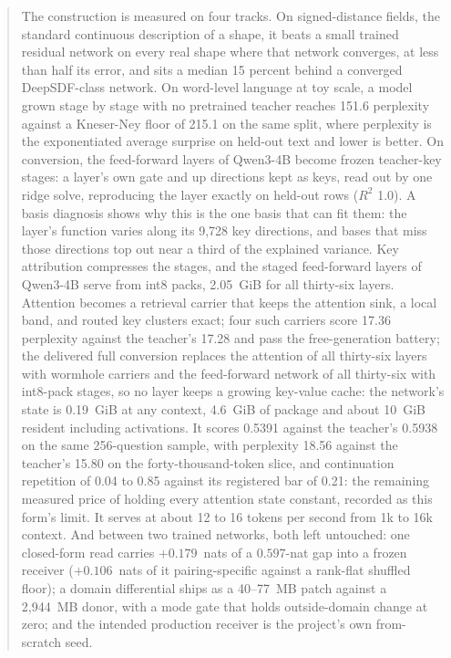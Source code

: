 \documentclass[11pt]{article}
\begin{document}
\begin{abstract}
The construction is measured on four tracks. On signed-distance
fields, the standard continuous description of a shape, it beats a
small trained residual network on every real shape where that
network converges, at less than half its error, and sits a median
15 percent behind a converged DeepSDF-class network. On word-level
language at toy scale, a model grown stage by stage with no
pretrained teacher reaches 151.6 perplexity against a Kneser-Ney
floor of 215.1 on the same split, where perplexity is the
exponentiated average surprise on held-out text and lower is
better. On conversion, the feed-forward layers of Qwen3-4B become
frozen teacher-key stages: a layer's own gate and up directions
kept as keys, read out by one ridge solve, reproducing the layer
exactly on held-out rows ($R^2$ 1.0). A basis diagnosis shows why
this is the one basis that can fit them: the layer's function
varies along its 9,728 key directions, and bases that miss those
directions top out near a third of the explained variance. Key
attribution compresses the stages, and the staged feed-forward
layers of Qwen3-4B serve from int8 packs, 2.05~GiB for all
thirty-six layers. Attention becomes a retrieval carrier that keeps the
attention sink, a local band, and routed key clusters exact; four
such carriers score 17.36 perplexity against the teacher's 17.28
and pass the free-generation battery; the delivered full
conversion
replaces the attention of all thirty-six layers with wormhole
carriers and the feed-forward network of all thirty-six with
int8-pack stages, so no layer keeps a growing key-value cache:
the network's state is 0.19~GiB at any context, 4.6~GiB of
package and about 10~GiB resident including activations. It
scores 0.5391 against the teacher's 0.5938 on the same
256-question sample, with perplexity 18.56 against the teacher's
15.80 on the forty-thousand-token slice, and continuation
repetition of 0.04 to 0.85 against its registered bar of 0.21:
the remaining measured price of holding every attention state
constant, recorded as this form's limit. It serves at about 12
to 16 tokens per second from 1k to 16k context. And between two
trained networks, both left untouched: one closed-form read
carries $+0.179$~nats of a $0.597$-nat gap into a frozen receiver
($+0.106$~nats of it pairing-specific against a rank-flat
shuffled floor); a domain differential ships as a 40--77~MB patch
against a 2{,}944~MB donor, with a mode gate that holds
outside-domain change at zero; and the intended production
receiver is the project's own from-scratch seed.


\end{abstract}
\end{document}

